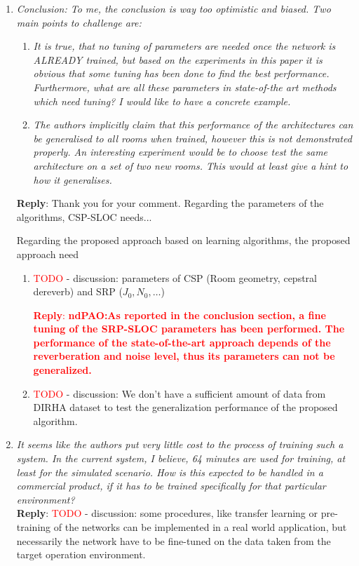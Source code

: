 \documentclass[11pt, technote, letterpaper, oneside, onecolumn]{IEEEtran}
\begin{document}
\begin{enumerate}
\item \textit{Conclusion: To me, the conclusion is way too optimistic and biased. Two main points to challenge are:}
	\begin{enumerate}
		\item  \textit{It is true, that no tuning of parameters are needed once the network is ALREADY trained, but based on the experiments in this paper it is obvious that some tuning has been done to find the best performance. Furthermore, what are all these parameters in state-of-the art methods which need tuning? I would like to have a concrete example.}
		\item  \textit{The authors implicitly claim that this performance of the architectures can be generalised to all rooms when trained, however this is not demonstrated properly. An interesting experiment would be to choose test the same architecture on a set of two new rooms. This would at least give a hint to how it generalises.}
	\end{enumerate}
 \textbf{Reply}: Thank you for your comment. Regarding the parameters of the algorithms, CSP-SLOC needs... 
 
 Regarding the proposed approach based on learning algorithms, the proposed approach need 
 
 
 \begin{enumerate}
 	\item \textcolor{red}{TODO} - discussion: parameters of CSP (Room geometry, cepstral dereverb) and SRP ($J_0, N_0, \dots$)
 	
 	 \textcolor{red}{\textbf{Reply}: \textbf{ndPAO:As reported in the conclusion section, a fine tuning of the SRP-SLOC parameters has been performed. The performance of the state-of-the-art approach depends of the reverberation and noise level, thus its parameters can not be generalized.} }
 	 
 	\item \textcolor{red}{TODO} - discussion: We don't have a sufficient amount of data from DIRHA dataset to test the generalization performance of the proposed algorithm. 
 \end{enumerate}

\item \textit{It seems like the authors put very little cost to the process of training such a system. In the current system, I believe, 64 minutes are used for training, at least for the simulated scenario. How is this expected to be handled in a commercial product, if it has to be trained specifically for that particular environment?\\}
\textbf{Reply}:
\textcolor{red}{TODO} - discussion: some procedures, like transfer learning or pre-training of the networks can be implemented in a real world application, but necessarily the network have to be fine-tuned on the data taken from the target operation environment.


\end{enumerate}
\end{document}
